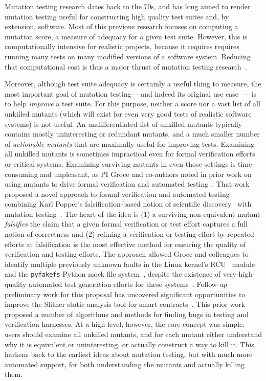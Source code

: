 Mutation testing research dates back to the 70s, and has long aimed to render
mutation testing useful for constructing high quality
test suites and, by extension, software.
Most of this previous
research focuses on computing a mutation score, a measure of adequacy for a
given test suite.  However, this is computationally intensive for realistic
projects, because it requires requires running many tests on many modified
versions of a software system.  Reducing that computational cost is thus a major
thrust of mutation testing research~\cite{jia2011analysis}.

Moreover, although test suite adequacy is certainly a useful thing to measure, the most
important goal of mutation testing\,---\,and indeed its original use
case~\cite{budd1980theoretical}\,---\,is to help \emph{improve} a test suite.  For this
purpose, neither a score nor a vast list of all unkilled mutants
(which will exist for even very good tests of realistic software systems) is not useful.  An
undifferentiated list of unkilled mutants typically contains mostly uninteresting or
redundant mutants, and a much smaller number of \emph{actionable mutants} that are
maximally useful for improving tests.  Examining all unkilled
mutants is sometimes impractical even for formal verification efforts or critical
systems.  Examining
surviving mutants in even those settings is
time-consuming and unpleasant, as PI Groce and co-authors noted in prior work on
using mutants to drive formal verification and automated
testing~\cite{groce2015verified,groce2018verified,mutKernel}.
%
That work proposed a novel approach to
formal verification and automated testing
combining Karl Popper's falsification-based notion of
scientific discovery~\cite{Popper,popperconjectures} with mutation
testing~\cite{groce2015verified,groce2018verified,mutKernel}.
The heart of the idea is (1) a surviving non-equivalent mutant
\emph{falsifies} the claim that a given
formal verification or test effort captures a full notion of
correctness and (2) refining a
verification or testing effort by repeated efforts at falsification is
the most
effective method for ensuring the quality of verification and testing
efforts.  The
approach allowed Groce and colleagues to identify multiple previously unknown faults in
the Linux kernel's
RCU~\cite{MathieuDesnoyers2012URCU,DinakarGuniguntala2008IBMSysJ,McKenney:2013:SDS:2483852.2483867}
module and the {\tt pyfakefs} Python mock file
system~\cite{pyfakefs}, despite the existence of very-high-quality
automated test generation efforts for these
systems~\cite{rcutorture,TSTL}.  Follow-up preliminary work for this
proposal has uncovered significant opportunities to improve the
Slither static analysis tool for smart contracts~\cite{slitherpaper,slither-code}.  This prior work
proposed a number of algorithms and
methods for finding bugs in testing and verification
harnesses.  At a high level, however,
the core concept was simple:  users should examine all unkilled
mutants, and for each mutant either understand why it is
equivalent or uninteresting, or actually construct a way to kill it.  This harkens back to the
earliest ideas about mutation testing, but with
much more automated support, for both understanding the mutants and
actually killing them.

